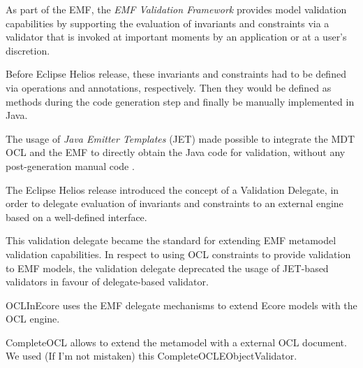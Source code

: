 \documentclass[
  10pt,				%
  oneside,
  a4paper,			%
  brazilian,
  english
]{abntex2}
\begin{document}
As part of the EMF, the \emph{EMF Validation Framework} provides model validation
capabilities by supporting the evaluation of invariants and constraints via a
validator that is invoked at important moments by an application or at a user's
discretion. \cite{emf_helios_nn}

Before Eclipse Helios release,
these invariants and constraints had to be defined
via operations and annotations, respectively. \cite[Chapter~18]{budinsky09}
Then they would be defined as methods during the code generation step and finally
be manually implemented in Java.


The usage of \emph{Java Emitter Templates} (JET) made possible to integrate the
MDT OCL and the EMF to directly obtain the Java code for validation, without any
post-generation manual code \cite{damus07}.

The Eclipse Helios release introduced
the concept of a Validation Delegate, in order to delegate evaluation of invariants and
constraints to an external engine based on a well-defined interface.\cite{emf_helios_nn}

This validation delegate became the standard for extending EMF metamodel validation
capabilities. In respect to using OCL constraints to provide validation to EMF
models, the validation delegate deprecated the usage of JET-based validators
in favour of delegate-based validator.



OCLInEcore uses the EMF delegate mechanisms to extend Ecore models with the OCL
engine.

CompleteOCL allows to extend the metamodel with a external OCL document.
We used (If I'm not mistaken) this CompleteOCLEObjectValidator.
\end{document}
